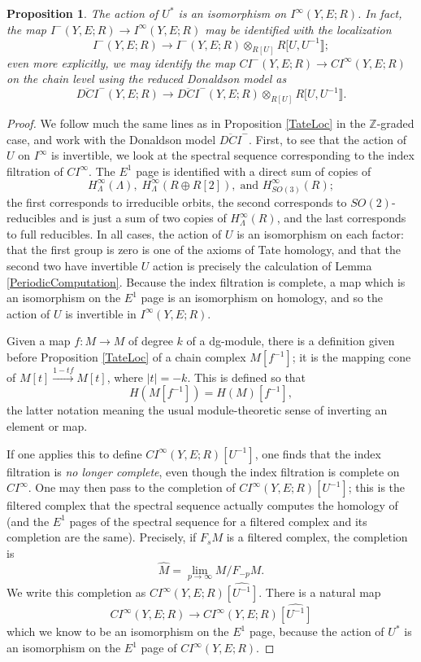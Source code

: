 \documentclass{memo-l}
\newtheorem{proposition}[theorem]{Proposition}
\theoremstyle{definition}
\theoremstyle{remark}
\numberwithin{section}{chapter}
\numberwithin{equation}{chapter}
\begin{document}
\begin{proposition}\label{InstTateLoc}The action of $U^*$ is an isomorphism on $I^\infty(Y,E;R)$. In fact, the map $I^-(Y,E;R) \to I^\infty(Y,E;R)$ may be identified with the localization $$I^-(Y,E;R) \to I^-(Y,E;R) \otimes_{R[U]} R[U, U^{-1}\rrbracket;$$ even more explicitly, we may identify the map $CI^-(Y,E;R) \to CI^\infty(Y,E;R)$ on the chain level using the reduced Donaldson model as $$\overline{DCI}^-(Y,E;R) \to \overline{DCI}^-(Y,E;R) \otimes_{R[U]} R[U, U^{-1}\rrbracket.$$
\end{proposition}
\begin{proof}We follow much the same lines as in Proposition \ref{TateLoc} in the $\mathbb Z$-graded case, and work with the Donaldson model $\overline{DCI}^-$. First, to see that the action of $U$ on $I^\infty$ is invertible, we look at the spectral sequence corresponding to the index filtration of $CI^\infty$. The $E^1$ page is identified with a direct sum of copies of 
$$H^\infty_{\Lambda}(\Lambda), \; H^\infty_{\Lambda}(R \oplus R[2]), \;\text{and } H^\infty_{SO(3)}(R);$$ 
the first corresponds to irreducible orbits, the second corresponds to $SO(2)$-reducibles and is just a sum of two copies of $H^\infty_\Lambda(R)$, and the last corresponds to full reducibles. In all cases, the action of $U$ is an isomorphism on each factor: that the first group is zero is one of the axioms of Tate homology, and that the second two have invertible $U$ action is precisely the calculation of Lemma \ref{PeriodicComputation}. Because the index filtration is complete, a map which is an isomorphism on the $E^1$ page is an isomorphism on homology, and so the action of $U$ is invertible in $I^\infty(Y,E;R)$.

Given a map $f: M \to M$ of degree $k$ of a dg-module, there is a definition given before Proposition \ref{TateLoc} of a chain complex $M[f^{-1}]$; it is the mapping cone of $M[t] \xrightarrow{1 - tf} M[t]$, where $|t| = -k$. This is defined so that 
$$H(M[f^{-1}]) = H(M)[f^{-1}],$$ the latter notation meaning the usual module-theoretic sense of inverting an element or map.

If one applies this to define $CI^\infty(Y,E;R)[U^{-1}]$, one finds that the index filtration is \emph{no longer complete}, even though the index filtration is complete on $CI^\infty$. One may then pass to the completion of $CI^\infty(Y,E;R)[U^{-1}]$; this is the filtered complex that the spectral sequence actually computes the homology of (and the $E^1$ pages of the spectral sequence for a filtered complex and its completion are the same). Precisely, if $F_s M$ is a filtered complex, the completion is $$\widehat M = \operatorname{lim}_{p \to \infty} M/F_{-p} M.$$ We write this completion as $CI^\infty(Y,E;R)\widehat{[U^{-1}]}$. There is a natural map $$CI^\infty(Y,E;R) \to CI^\infty(Y,E;R)\widehat{[U^{-1}]}$$ which we know to be an isomorphism on the $E^1$ page, because the action of $U^*$ is an isomorphism on the $E^1$ page of $CI^\infty(Y,E;R)$.


\end{proof}
\end{document}
